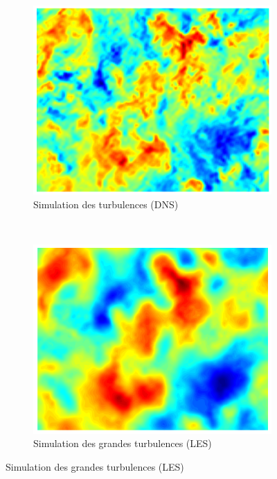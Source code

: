\begin{figure}[ht]
  \centering
  \begin{subfigure}[b]{0.5\textwidth}
    \centering
    \includegraphics[scale=0.35]{figures/DNS_Velocity_Field.png}
    \caption{\label{fig:label} Simulation des turbulences (DNS)}
  \end{subfigure}%
  ~
  \begin{subfigure}[b]{0.5\textwidth}
    \centering
    \includegraphics[scale=0.35]{figures/DNS_Filtered_Velocity_Field_Large.png}
    \caption{\label{fig:label} Simulation des grandes turbulences (LES)}
  \end{subfigure}
\end{figure}

